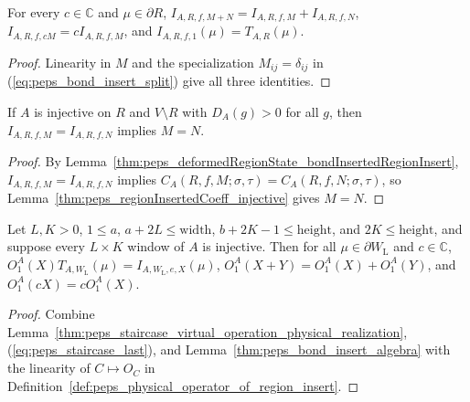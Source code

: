 \begin{lemma}%
    \label{thm:peps_bond_insert_algebra}
    \leanok
    For every $c\in\mathbb C$ and $\mu\in\partial R$,
    $I_{A,R,f,M+N}=I_{A,R,f,M}+I_{A,R,f,N}$,
    $I_{A,R,f,cM}=cI_{A,R,f,M}$, and
    $I_{A,R,f,1}(\mu)=T_{A,R}(\mu)$.
\end{lemma}
\begin{proof}
    \leanok
    Linearity in $M$ and the specialization $M_{ij}=\delta_{ij}$ in
    (\ref{eq:peps_bond_insert_split}) give all three identities.
\end{proof}

\begin{lemma}%
    \label{thm:peps_bond_insert_injective}
    \leanok
    If $A$ is injective on $R$ and $V\setminus R$ with $D_A(g)>0$ for all $g$,
    then $I_{A,R,f,M}=I_{A,R,f,N}$ implies $M=N$.
\end{lemma}
\begin{proof}
    \leanok
    By Lemma~\ref{thm:peps_deformedRegionState_bondInsertedRegionInsert},
    $I_{A,R,f,M}=I_{A,R,f,N}$ implies
    $C_A(R,f,M;\sigma,\tau)=C_A(R,f,N;\sigma,\tau)$, so
    Lemma~\ref{thm:peps_regionInsertedCoeff_injective} gives $M=N$.
\end{proof}

\begin{lemma}%
    \label{thm:peps_staircase_left_realization}
    \leanok
    Let $L,K>0$, $1\leq a$, $a+2L\leq\mathrm{width}$,
    $b+2K-1\leq\mathrm{height}$, and $2K\leq\mathrm{height}$, and suppose every
    $L\times K$ window of $A$ is injective. Then for all $\mu\in\partial W_{\mathrm L}$
    and $c\in\mathbb C$,
    $O_1^A(X)T_{A,W_{\mathrm L}}(\mu)=I_{A,W_{\mathrm L},e,X}(\mu)$,
    $O_1^A(X+Y)=O_1^A(X)+O_1^A(Y)$, and $O_1^A(cX)=cO_1^A(X)$.
\end{lemma}
\begin{proof}
    \leanok
    Combine Lemma~\ref{thm:peps_staircase_virtual_operation_physical_realization},
    (\ref{eq:peps_staircase_last}), and Lemma~\ref{thm:peps_bond_insert_algebra}
    with the linearity of $C\mapsto O_C$ in
    Definition~\ref{def:peps_physical_operator_of_region_insert}.
\end{proof}

